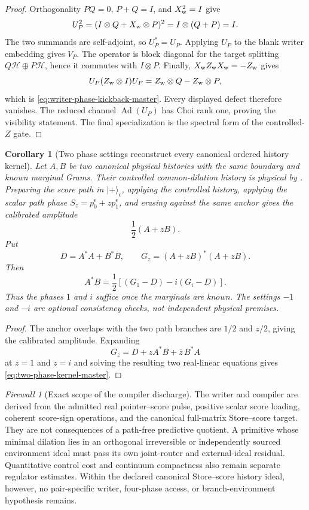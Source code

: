 \documentclass[11pt]{article}
\newtheorem{corollary}[theorem]{Corollary}
\theoremstyle{definition}
\theoremstyle{remark}
\newtheorem{firewall}[theorem]{Firewall}
\begin{document}
\begin{proof}
Orthogonality $PQ=0$, $P+Q=I$, and $X_{\rm w}^2=I$ give
\[
 U_P^2
 =(I\otimes Q+X_{\rm w}\otimes P)^2
 =I\otimes(Q+P)=I.
\]
The two summands are self-adjoint, so $U_P^*=U_P$.  Applying $U_P$ to the
blank writer embedding gives $V_P$.  The operator is block diagonal for the
target splitting $Q\mathcal H\oplus P\mathcal H$, hence it commutes with
$I\otimes P$.  Finally,
$X_{\rm w}Z_{\rm w}X_{\rm w}=-Z_{\rm w}$ gives
\[
 U_P(Z_{\rm w}\otimes I)U_P
 =Z_{\rm w}\otimes Q-Z_{\rm w}\otimes P,
\]
which is \eqref{eq:writer-phase-kickback-master}.  Every displayed defect
therefore vanishes.  The reduced channel $\operatorname{Ad}(U_P)$ has Choi
rank one, proving the visibility statement.  The final specialization is the
spectral form of the controlled-$Z$ gate.
\end{proof}

\begin{corollary}[Two phase settings reconstruct every canonical ordered
history kernel]
\label{cor:canonical-two-phase-history-master}
Let $A,B$ be two canonical physical histories with the same boundary and
known marginal Grams.  Their controlled common-dilation history is physical
by .  Preparing the score path in
$|+\rangle_{\epsilon}$, applying the controlled history, applying the scalar
path phase $S_z=p_0^{\epsilon}+zp_1^{\epsilon}$, and erasing against the same
anchor gives the calibrated amplitude
\[
 \frac12(A+zB).
\]
Put
\[
 D=A^*A+B^*B,\qquad
 G_z=(A+zB)^*(A+zB).
\]
Then
\begin{equation}
 \boxed{
 A^*B
 =\frac12\left[
 (G_1-D)-i(G_i-D)
 \right].}
 \label{eq:two-phase-kernel-master}
\end{equation}
Thus the phases $1$ and $i$ suffice once the marginals are known.  The
settings $-1$ and $-i$ are optional consistency checks, not independent
physical premises.
\end{corollary}

\begin{proof}
The anchor overlaps with the two path branches are $1/2$ and $z/2$, giving
the calibrated amplitude.  Expanding
\[
 G_z=D+zA^*B+\overline z\,B^*A
\]
at $z=1$ and $z=i$ and solving the resulting two real-linear equations gives
\eqref{eq:two-phase-kernel-master}.
\end{proof}

\begin{firewall}[Exact scope of the compiler discharge]
\label{fire:canonical-compiler-scope-master}
The writer and compiler are derived from the admitted real pointer--score
pulse, positive scalar score loading, coherent score-sign operations, and the
canonical full-matrix Store--score target.  They are not consequences of a
path-free predictive quotient.  A primitive whose minimal dilation lies in an
orthogonal irreversible or independently sourced environment ideal must pass
its own joint-router and external-ideal residual.  Quantitative control cost
and continuum compactness also remain separate regulator estimates.  Within
the declared canonical Store--score history ideal, however, no pair-specific
writer, four-phase access, or branch-environment hypothesis remains.
\end{firewall}
\end{document}
